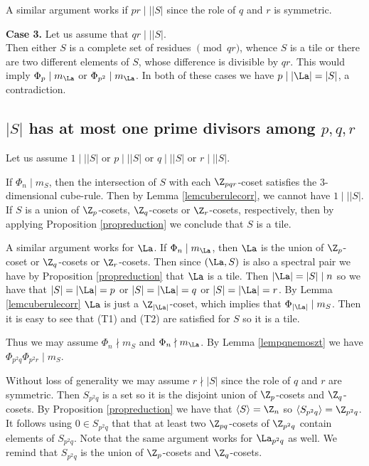         A similar argument works if $pr \mid \mid |S|$ since the role of $q$ and $r$ is symmetric.
        
        
        
        
        
        
        
        
        {\bf Case 3.}
        Let us assume that $qr \mid\mid |S|$. \\
        Then either $S$ is a complete set of residues $\pmod{qr}$, whence $S$ is a tile or there are two different elements of $S$, whose difference is divisible by $qr$. This would imply $\Phi_p  \mid m_{\La}$ or $\Phi_{p^2}  \mid m_{\La}$. In both of these cases we have $p  \mid |\La|=|S|$, a contradiction. 
        
        \subsection{$|S|$ has at most one prime divisors among $p,q,r$}
        Let us assume $1 \mid\mid |S|$ or $p \mid\mid |S|$ or $q \mid\mid |S|$ or $r \mid\mid |S|$. 
        
        If $\Phi_n \mid m_S$, then the intersection of $S$ with each $\Z_{pqr}$-coset satisfies the $3$-dimensional cube-rule. 
        Then by Lemma \ref{lemcuberulecorr}, we cannot have $1 \mid\mid |S|$. If $S$ is a union of $\Z_p$-cosets, $\Z_q$-cosets or $\Z_r$-cosets, respectively, then by applying Proposition \ref{propreduction} we conclude that $S$ is a tile. 
        
        A similar argument works for $\La$. If $\Phi_n \mid m_{\La}$, then $\La$ is the union of $\Z_p$-coset or $\Z_q$-cosets or $\Z_r$-cosets. Then since $(\La,S)$ is also a spectral pair we 
        have by Proposition \ref{propreduction} that $\La$ is a tile. Then $|\La| = |S|\mid n$ so we have that $|S|=|\La|=p$ or $|S|=|\La|=q$ or $|S|=|\La|=r$. By Lemma  \ref{lemcuberulecorr} $\La$ is just a $\Z_{|\La|}$-coset, which implies that $\Phi_{|\La|} \mid m_S$. Then it is easy to see that (T1) and (T2) are satisfied for $S$ so it is a tile.
        
        Thus we may assume $\Phi_n \nmid m_S$ and    $\Phi_n \nmid m_{\La}$.
        By Lemma \ref{lempqnemoszt} we have $\Phi_{p^2q} \Phi_{p^2r}\mid m_{S}$.
        
        Without loss of generality we may assume $r \nmid |S|$ since the role of $q$ and $r$ are symmetric. 
        Then $S_{p^2q}$ is a set so it is the disjoint union of $\Z_p$-cosets and $\Z_q$-cosets. 
        By Proposition \ref{propreduction} we have that $\langle S \rangle= \Z_n$ so $\langle S_{p^2q} \rangle= \Z_{p^2q}$. It follows using $0 \in S_{p^2q}$ that that at least two $\Z_{pq}$-cosets of $\Z_{p^2q}$ contain elements of $S_{p^2q}$.
        Note that the same argument works for $\La_{p^2q}$ as well.
        We remind that $S_{p^2q}$
        is the union of $\Z_p$-cosets and $\Z_q$-cosets. 
        

